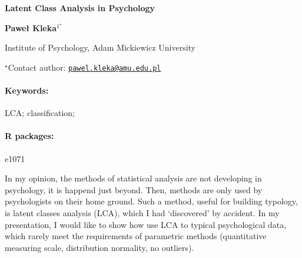 \documentclass[11pt, a4paper]{article}
\renewcommand{\title}[1]{\begin{center}{\bf \LARGE #1}\end{center}}
\newcommand{\keywords}{\paragraph{Keywords:}}
\newcommand{\packages}{\paragraph{R packages:}}
\begin{document}
\pagestyle{empty}

\title{Latent Class Analysis in Psychology}

\begin{center}
  {\bf Paweł Kleka$^{1^\star}$}
\end{center}

\vskip 0.3cm

\begin{affiliations}
\begin{enumerate}
\begin{minipage}{0.915\textwidth}
\centering
\item Institute of Psychology, Adam Mickiewicz University \\[-2pt]
\end{minipage}
\end{enumerate}
$^\star$Contact author: \href{mailto:pawel.kleka@amu.edu.pl}{\nolinkurl{pawel.kleka@amu.edu.pl}}\\
\end{affiliations}

\vskip 0.5cm

\begin{minipage}{0.915\textwidth}
\keywords LCA; classification;
\packages e1071
\end{minipage}

\vskip 0.8cm

In my opinion, the methods of statistical analysis are not developing in
psychology, it is happend just beyond. Then, methods are only used by
psychologists on their home ground. Such a method, useful for building
typology, is latent classes analysis (LCA), which I had `discovered' by
accident. In my presentation, I would like to show how use LCA to
typical psychological data, which rarely meet the requirements of
parametric methods (quantitative measuring scale, distribution
normality, no outliers).
\end{document}
